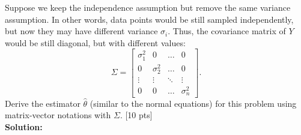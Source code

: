 \documentclass[twoside,10pt]{article}
\begin{document}
Suppose we keep the independence assumption but
remove the same variance assumption. In other words, data points would be
still sampled independently, but now they may have different
variance $\sigma_i$. Thus, the covariance matrix of $Y$ would be still
diagonal, but with different values:
\begin{equation}
\Sigma = \begin{bmatrix}
\sigma_1^2 & 0 & \dots & 0\\
0 & \sigma_2^2& \dots & 0\\
\vdots & \vdots & \ddots & \vdots\\
0 & 0 & \dots & \sigma_n^2
\end{bmatrix}.
\end{equation}
Derive the estimator $\hat{\theta}$ (similar to the normal equations) for this problem using matrix-vector
notations with $\Sigma$. [10 pts]\\
\textbf{ Solution: }
\end{document}
